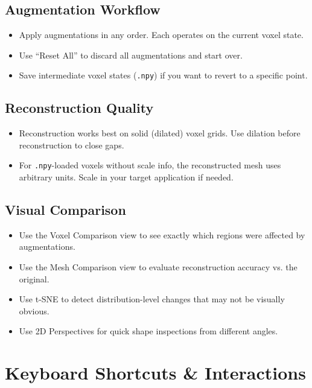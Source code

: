 \documentclass[12pt,a4paper]{article}
\begin{document}
\subsection{Augmentation Workflow}
\begin{itemize}
  \item Apply augmentations in any order. Each operates on the current voxel state.
  \item Use ``Reset All'' to discard all augmentations and start over.
  \item Save intermediate voxel states (\texttt{.npy}) if you want to revert to a specific point.
\end{itemize}

\subsection{Reconstruction Quality}
\begin{itemize}
  \item Reconstruction works best on solid (dilated) voxel grids. Use dilation before reconstruction to close gaps.
  \item For \texttt{.npy}-loaded voxels without scale info, the reconstructed mesh uses arbitrary units. Scale in your target application if needed.
\end{itemize}

\subsection{Visual Comparison}
\begin{itemize}
  \item Use the Voxel Comparison view to see exactly which regions were affected by augmentations.
  \item Use the Mesh Comparison view to evaluate reconstruction accuracy vs. the original.
  \item Use t-SNE to detect distribution-level changes that may not be visually obvious.
  \item Use 2D Perspectives for quick shape inspections from different angles.
\end{itemize}

\section{Keyboard Shortcuts \& Interactions}
\end{document}
